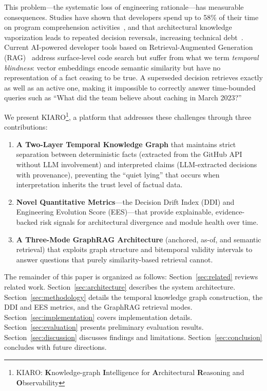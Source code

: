 \documentclass[conference]{IEEEtran}
\begin{document}
This problem---the systematic loss of engineering rationale---has measurable consequences. Studies have shown that developers spend up to 58\% of their time on program comprehension activities~\cite{xia2017measuring}, and that architectural knowledge vaporization leads to repeated decision reversals, increasing technical debt~\cite{avgeriou2016managing}. Current AI-powered developer tools based on Retrieval-Augmented Generation (RAG)~\cite{lewis2020retrieval} address surface-level code search but suffer from what we term \emph{temporal blindness}: vector embeddings encode semantic similarity but have no representation of a fact ceasing to be true. A superseded decision retrieves exactly as well as an active one, making it impossible to correctly answer time-bounded queries such as ``What did the team believe about caching in March 2023?''

We present KIARO\footnote{KIARO: \textbf{K}nowledge-graph \textbf{I}ntelligence for \textbf{A}rchitectural \textbf{R}easoning and \textbf{O}bservability}, a platform that addresses these challenges through three contributions:

\begin{enumerate}
    \item \textbf{A Two-Layer Temporal Knowledge Graph} that maintains strict separation between deterministic facts (extracted from the GitHub API without LLM involvement) and interpreted claims (LLM-extracted decisions with provenance), preventing the ``quiet lying'' that occurs when interpretation inherits the trust level of factual data.
    \item \textbf{Novel Quantitative Metrics}---the Decision Drift Index (DDI) and Engineering Evolution Score (EES)---that provide explainable, evidence-backed risk signals for architectural divergence and module health over time.
    \item \textbf{A Three-Mode GraphRAG Architecture} (anchored, as-of, and semantic retrieval) that exploits graph structure and bitemporal validity intervals to answer questions that purely similarity-based retrieval cannot.
\end{enumerate}

The remainder of this paper is organized as follows: Section~\ref{sec:related} reviews related work. Section~\ref{sec:architecture} describes the system architecture. Section~\ref{sec:methodology} details the temporal knowledge graph construction, the DDI and EES metrics, and the GraphRAG retrieval modes. Section~\ref{sec:implementation} covers implementation details. Section~\ref{sec:evaluation} presents preliminary evaluation results. Section~\ref{sec:discussion} discusses findings and limitations. Section~\ref{sec:conclusion} concludes with future directions.
\end{document}
